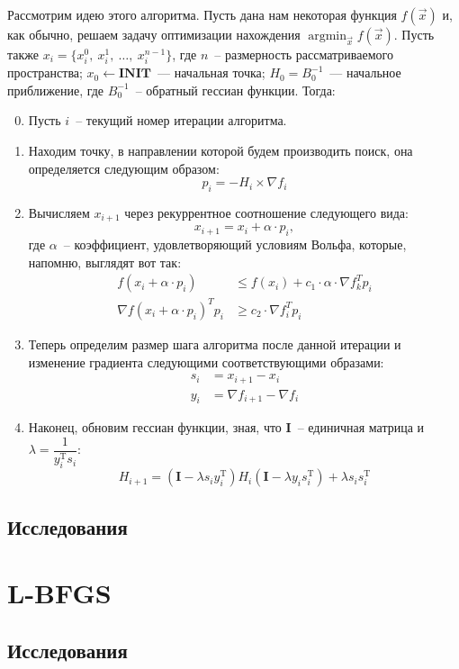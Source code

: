 \documentclass[12pt, a4paper, oneside, final]{article}
\begin{document}
	Рассмотрим идею этого алгоритма.
	Пусть дана нам некоторая функция $f(\vec{x})$ и, как обычно, решаем задачу оптимизации нахождения $\operatorname*{argmin}_{\vec{x}}{f(\vec{x})}$.
	Пусть также $x_{i} = \{x_{i}^{0}, ~ x_{i}^{1}, ~ \ldots, ~ x_{i}^{n - 1}\}$, где $n$~-- размерность рассматриваемого пространства; $x_{0} \gets \textbf{INIT}$~--- начальная точка; $H_{0} = B_{0}^{-1}$~--- начальное приближение, где $B_{0}^{-1}$~-- обратный гессиан функции.
	Тогда:
	\begin{enumerate}[1)]
		\setcounter{enumi}{-1}
		\item Пусть $i$~-- текущий номер итерации алгоритма.
		\item Находим точку, в направлении которой будем производить поиск, она определяется следующим образом:
		\[
			p_{i} = -H_{i} \times \nabla{f_{i}}
		\]
		\item Вычисляем $x_{i + 1}$ через рекуррентное соотношение следующего вида:
		\[
			x_{i + 1} = x_{i} + \alpha \cdot p_{i},
		\] где $\alpha$~-- коэффициент, удовлетворяющий условиям Вольфа, которые, напомню, выглядят вот так:
		\begin{align*}
			f(x_{i} + \alpha \cdot p_{i}) &\leqslant f(x_{i}) + c_{1} \cdot \alpha \cdot \nabla{f^{T}_{k}p_{i}} \\
			\nabla{f(x_{i} + \alpha \cdot p_{i})^{T}p_{i}} &\geqslant c_{2} \cdot \nabla{f^{T}_{i}p_{i}}
		\end{align*}
		\item Теперь определим размер шага алгоритма после данной итерации и изменение градиента следующими соответствующими образами:
		\begin{align*}
			s_{i} &= x_{i + 1} - x_{i} \\
			y_{i} &= \nabla{f_{i + 1}} - \nabla{f_{i}}
		\end{align*}
		\item Наконец, обновим гессиан функции, зная, что $\mathbf{I}$~-- единичная матрица и $\lambda = \dfrac{1}{y_{i}^{\mathrm{T}}s_{i}}$:
		\[
			H_{i + 1} = \left(\mathbf{I} - \lambda s_{i}y_{i}^{\mathrm{T}}\right)H_{i}\left(\mathbf{I} - \lambda y_{i} s_{i}^{\mathrm{T}}\right) + \lambda s_{i} s_{i}^{\mathrm{T}}
		\]
	\end{enumerate}
	\subsection*{Исследования}
	\newpage
	\section*{L-BFGS}
	\subsection*{Исследования}
\end{document}
